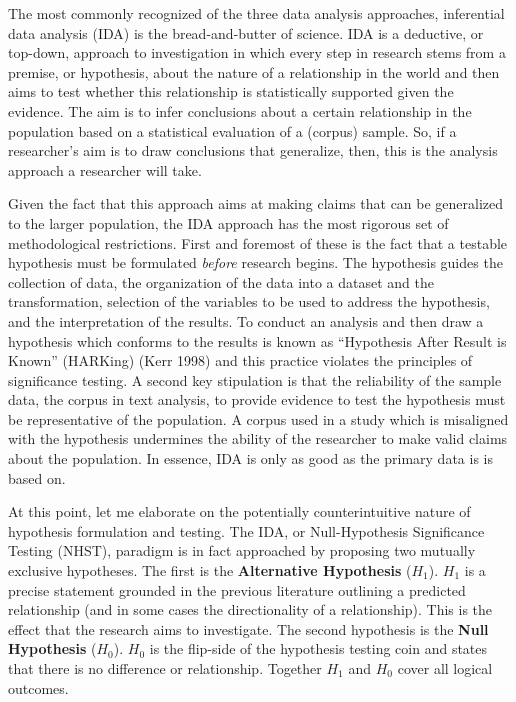 \documentclass[
  letterpaper,
]{latex/krantz}
\begin{document}
The most commonly recognized of the three data analysis approaches,
inferential data analysis (IDA) is the bread-and-butter of science. IDA
is a deductive, or top-down, approach to investigation in which every
step in research stems from a premise, or hypothesis, about the nature
of a relationship in the world and then aims to test whether this
relationship is statistically supported given the evidence. The aim is
to infer conclusions about a certain relationship in the population
based on a statistical evaluation of a (corpus) sample. So, if a
researcher's aim is to draw conclusions that generalize, then, this is
the analysis approach a researcher will take.

Given the fact that this approach aims at making claims that can be
generalized to the larger population, the IDA approach has the most
rigorous set of methodological restrictions. First and foremost of these
is the fact that a testable hypothesis must be formulated \emph{before}
research begins. The hypothesis guides the collection of data, the
organization of the data into a dataset and the transformation,
selection of the variables to be used to address the hypothesis, and the
interpretation of the results. To conduct an analysis and then draw a
hypothesis which conforms to the results is known as ``Hypothesis After
Result is Known'' (HARKing) (Kerr 1998) and this practice violates the
principles of significance testing. A second key stipulation is that the
reliability of the sample data, the corpus in text analysis, to provide
evidence to test the hypothesis must be representative of the
population. A corpus used in a study which is misaligned with the
hypothesis undermines the ability of the researcher to make valid claims
about the population. In essence, IDA is only as good as the primary
data is is based on.

At this point, let me elaborate on the potentially counterintuitive
nature of hypothesis formulation and testing. The IDA, or
Null-Hypothesis Significance Testing (NHST), paradigm is in fact
approached by proposing two mutually exclusive hypotheses. The first is
the \textbf{Alternative Hypothesis} (\(H_1\)). \(H_1\) is a precise
statement grounded in the previous literature outlining a predicted
relationship (and in some cases the directionality of a relationship).
This is the effect that the research aims to investigate. The second
hypothesis is the \textbf{Null Hypothesis} (\(H_0\)). \(H_0\) is the
flip-side of the hypothesis testing coin and states that there is no
difference or relationship. Together \(H_1\) and \(H_0\) cover all
logical outcomes.
\end{document}
